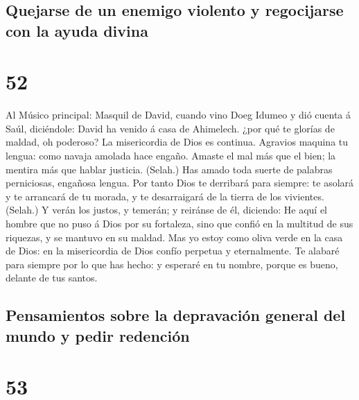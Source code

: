 \hypertarget{quejarse-de-un-enemigo-violento-y-regocijarse-con-la-ayuda-divina}{%
\subsection{Quejarse de un enemigo violento y regocijarse con la ayuda
divina}\label{quejarse-de-un-enemigo-violento-y-regocijarse-con-la-ayuda-divina}}

\hypertarget{section-51}{%
\section{52}\label{section-51}}

 Al Músico principal: Masquil de David, cuando vino Doeg
Idumeo y dió cuenta á Saúl, diciéndole: David ha venido á casa de
Ahimelech. ¿por qué te glorías de maldad, oh poderoso? La misericordia
de Dios es continua.  Agravios maquina tu lengua: como
navaja amolada hace engaño.  Amaste el mal más que el
bien; la mentira más que hablar justicia. (Selah.)  Has
amado toda suerte de palabras perniciosas, engañosa lengua.
 Por tanto Dios te derribará para siempre: te asolará y te
arrancará de tu morada, y te desarraigará de la tierra de los vivientes.
(Selah.)  Y verán los justos, y temerán; y reiránse de él,
diciendo:  He aquí el hombre que no puso á Dios por su
fortaleza, sino que confió en la multitud de sus riquezas, y se mantuvo
en su maldad.  Mas yo estoy como oliva verde en la casa de
Dios: en la misericordia de Dios confío perpetua y eternalmente.
 Te alabaré para siempre por lo que has hecho: y esperaré
en tu nombre, porque es bueno, delante de tus santos.

\hypertarget{pensamientos-sobre-la-depravaciuxf3n-general-del-mundo-y-pedir-redenciuxf3n-1}{%
\subsection{Pensamientos sobre la depravación general del mundo y pedir
redención}\label{pensamientos-sobre-la-depravaciuxf3n-general-del-mundo-y-pedir-redenciuxf3n-1}}

\hypertarget{section-52}{%
\section{53}\label{section-52}}


